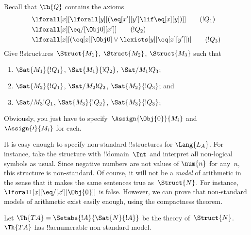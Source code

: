 \documentclass[../../../include/open-logic-section]{subfiles}
\begin{document}
\begin{prob}
Recall that $\Th{Q}$ contains the axioms
\begin{align*}
& \lforall[x][\lforall[y][(\eq[x'][y'] \lif \eq[x][y])]] \tag{$!Q_1$}\\
& \lforall[x][\eq/[\Obj 0][x']] \tag{$!Q_2$}\\
& \lforall[x][(\eq[x][\Obj 0] \lor \lexists[y][\eq[x][y']])] \tag{$!Q_3$}
\end{align*}
Give !!{structure}s~$\Struct{M_1}$, $\Struct{M_2}$, $\Struct{M_3}$ such that
\begin{enumerate}
\item $\Sat{M_1}{!Q_1}$, $\Sat{M_1}{!Q_2}$, $\Sat/{M_1}{!Q_3}$;
\item $\Sat{M_2}{!Q_1}$, $\Sat/{M_2}{!Q_2}$, $\Sat{M_2}{!Q_3}$; and
\item $\Sat/{M_3}{!Q_1}$, $\Sat{M_3}{!Q_2}$, $\Sat{M_3}{!Q_3}$;
\end{enumerate}
Obviously, you just have to specify~$\Assign{\Obj{0}}{M_i}$ and
$\Assign{\prime}{M_i}$ for each.
\end{prob}

\begin{explain}
It is easy enough to specify non-standard !!{structure}s for
$\Lang{L_A}$. For instance, take the structure with !!{domain}~$\Int$
and interpret all non-logical symbols as usual. Since negative numbers
are not values of $\num{n}$ for any~$n$, this structure is
non-standard. Of course, it will not be a \emph{model} of arithmetic
in the sense that it makes the same sentences true
as~$\Struct{N}$. For instance, $\lforall[x][\eq/[x'][\Obj{0}]]$ is
false.  However, we can prove that non-standard models of arithmetic
exist easily enough, using the compactness theorem.
\end{explain}

\begin{prop}
Let $\Th{TA} = \Setabs{!A}{\Sat{N}{!A}}$ be the theory
of~$\Struct{N}$. $\Th{TA}$ has !!a{enumerable} non-standard model.
\end{prop}
\end{document}

